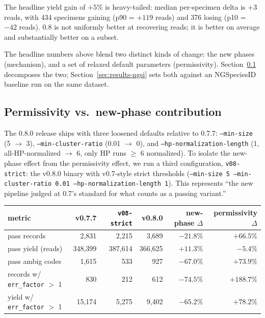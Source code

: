 \documentclass[11pt]{article}
\begin{document}
The headline yield gain of $+5\%$ is heavy-tailed: median per-specimen
delta is $+3$ reads, with 434 specimens gaining (p90 = $+119$ reads) and
376 losing (p10 = $-42$ reads). 0.8 is not uniformly better at recovering
reads; it is better on average and substantially better on a subset.

The headline numbers above blend two distinct kinds of change: the new
phases (mechanism), and a set of relaxed default parameters
(permissivity). Section~\ref{sec:results-permissivity} decomposes the
two; Section~\ref{sec:results-ngsi} sets both against an NGSpeciesID
baseline run on the same dataset.

\subsection{Permissivity vs.~new-phase contribution}
\label{sec:results-permissivity}

The 0.8.0 release ships with three loosened defaults relative to 0.7.7:
\texttt{--min-size} (5 $\to$ 3), \texttt{--min-cluster-ratio} (0.01
$\to$ 0), and \texttt{--hp-normalization-length} (1, all-HP-normalized
$\to$ 6, only HP runs $\geq$ 6 normalized). To isolate the new-phase
effect from the permissivity effect, we run a third configuration,
\texttt{v08-strict}: the v0.8.0 binary with v0.7-style strict thresholds
(\texttt{--min-size 5 --min-cluster-ratio 0.01 --hp-normalization-length
1}). This represents ``the new pipeline judged at 0.7's standard for
what counts as a passing variant.''

\begin{center}
\begin{tabular}{lrrrrr}
\toprule
metric & v0.7.7 & \texttt{v08-strict} & v0.8.0 & new-phase $\Delta$ & permissivity $\Delta$ \\
\midrule
pass records & 2,831 & 2,215 & 3,689 & $\mathbf{-21.8\%}$ & $\mathbf{+66.5\%}$ \\
pass yield (reads) & 348,399 & 387,614 & 366,625 & $+11.3\%$ & $-5.4\%$ \\
pass ambig codes & 1,615 & 533 & 927 & $\mathbf{-67.0\%}$ & $\mathbf{+73.9\%}$ \\
records w/ \texttt{err\_factor} $>$ 1 & 830 & 212 & 612 & $\mathbf{-74.5\%}$ & $\mathbf{+188.7\%}$ \\
yield w/ \texttt{err\_factor} $>$ 1 & 15,174 & 5,275 & 9,402 & $\mathbf{-65.2\%}$ & $\mathbf{+78.2\%}$ \\
\bottomrule
\end{tabular}
\end{center}
\end{document}
